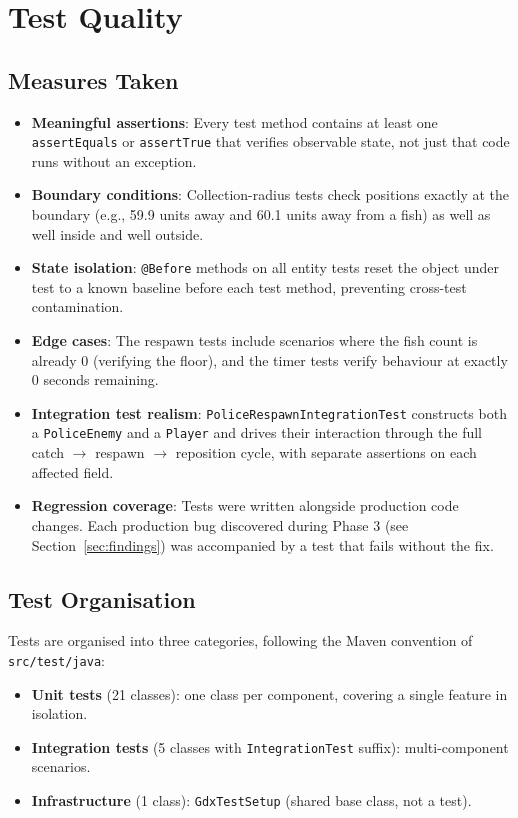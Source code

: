 \documentclass[12pt]{article}
\begin{document}
\section{Test Quality}

\subsection{Measures Taken}

\begin{itemize}[itemsep=3pt]
  \item \textbf{Meaningful assertions}: Every test method contains at least one \texttt{assertEquals} or \texttt{assertTrue} that verifies observable state, not just that code runs without an exception.
  \item \textbf{Boundary conditions}: Collection-radius tests check positions exactly at the boundary (e.g., 59.9 units away and 60.1 units away from a fish) as well as well inside and well outside.
  \item \textbf{State isolation}: \texttt{@Before} methods on all entity tests reset the object under test to a known baseline before each test method, preventing cross-test contamination.
  \item \textbf{Edge cases}: The respawn tests include scenarios where the fish count is already 0 (verifying the floor), and the timer tests verify behaviour at exactly 0 seconds remaining.
  \item \textbf{Integration test realism}: \texttt{PoliceRespawnIntegrationTest} constructs both a \texttt{PoliceEnemy} and a \texttt{Player} and drives their interaction through the full catch $\to$ respawn $\to$ reposition cycle, with separate assertions on each affected field.
  \item \textbf{Regression coverage}: Tests were written alongside production code changes. Each production bug discovered during Phase 3 (see Section~\ref{sec:findings}) was accompanied by a test that fails without the fix.
\end{itemize}

\subsection{Test Organisation}

Tests are organised into three categories, following the Maven convention of \texttt{src/test/java}:

\begin{itemize}[itemsep=2pt]
  \item \textbf{Unit tests} (21 classes): one class per component, covering a single feature in isolation.
  \item \textbf{Integration tests} (5 classes with \texttt{IntegrationTest} suffix): multi-component scenarios.
  \item \textbf{Infrastructure} (1 class): \texttt{GdxTestSetup} (shared base class, not a test).
\end{itemize}
\end{document}
